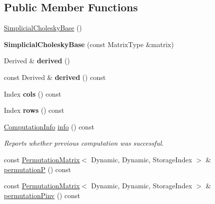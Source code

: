 \subsection*{Public Member Functions}
\begin{DoxyCompactItemize}
\item 
\mbox{\hyperlink{class_eigen_1_1_simplicial_cholesky_base_a098baba1dbe07ca3a775c8df1f8a0e71}{Simplicial\+Cholesky\+Base}} ()
\item 
\mbox{\label{class_eigen_1_1_simplicial_cholesky_base_a90bd237828d21cb509c815f2787153b2}} 
{\bfseries Simplicial\+Cholesky\+Base} (const Matrix\+Type \&matrix)
\item 
\mbox{\label{class_eigen_1_1_simplicial_cholesky_base_a1b7c0264498027c7ef5137b5e6f9d91f}} 
Derived \& {\bfseries derived} ()
\item 
\mbox{\label{class_eigen_1_1_simplicial_cholesky_base_ab711e243888c29902afba59faee258ff}} 
const Derived \& {\bfseries derived} () const
\item 
\mbox{\label{class_eigen_1_1_simplicial_cholesky_base_aa494e6ff5a27911c1f8c1fb27a56ff1a}} 
Index {\bfseries cols} () const
\item 
\mbox{\label{class_eigen_1_1_simplicial_cholesky_base_aafce8db4ee2d23ecf8888260d7c8b187}} 
Index {\bfseries rows} () const
\item 
\mbox{\hyperlink{group__enums_ga85fad7b87587764e5cf6b513a9e0ee5e}{Computation\+Info}} \mbox{\hyperlink{class_eigen_1_1_simplicial_cholesky_base_a3ac877f73aaaff670e6ae7554eb02fc8}{info}} () const
\begin{DoxyCompactList}\small\item\em Reports whether previous computation was successful. \end{DoxyCompactList}\item 
const \mbox{\hyperlink{class_eigen_1_1_permutation_matrix}{Permutation\+Matrix}}$<$ Dynamic, Dynamic, Storage\+Index $>$ \& \mbox{\hyperlink{class_eigen_1_1_simplicial_cholesky_base_aff1480e595a21726beaec9a586a94d5a}{permutationP}} () const
\item 
const \mbox{\hyperlink{class_eigen_1_1_permutation_matrix}{Permutation\+Matrix}}$<$ Dynamic, Dynamic, Storage\+Index $>$ \& \mbox{\hyperlink{class_eigen_1_1_simplicial_cholesky_base_a0e23d1f4a88c211be7098faf1cb41674}{permutation\+Pinv}} () const

\end{DoxyCompactItemize}

